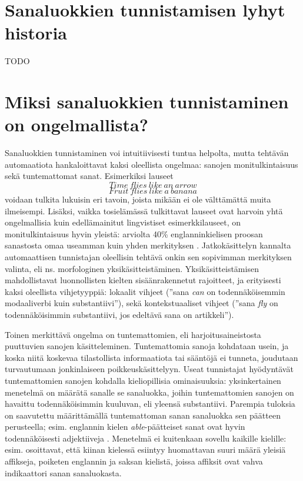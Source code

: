 \documentclass[utf8,bachelor,manualbib]{gradu3}
\begin{document}
\section{Sanaluokkien tunnistamisen lyhyt historia}

TODO


\section{Miksi sanaluokkien tunnistaminen on ongelmallista?}

Sanaluokkien tunnistaminen voi intuitiivisesti tuntua helpolta, mutta tehtävän automaatiota hankaloittavat kaksi oleellista ongelmaa: sanojen monitulkintaisuus sekä tuntemattomat sanat. Esimerkiksi lauseet
\[Time\: flies\: like\: an\: arrow\]
\[Fruit\: flies\: like\: a\: banana\]
voidaan tulkita lukuisin eri tavoin, joista mikään ei ole välttämättä muita ilmeisempi. Lisäksi, vaikka tosielämässä tulkittavat lauseet ovat harvoin yhtä ongelmallisia kuin edellämainitut lingvistiset esimerkkilauseet, on monitulkintaisuus hyvin yleistä: arviolta 40\% englanninkielisen proosan sanastosta omaa useamman kuin yhden merkityksen \citep{derose1988}. Jatkokäsittelyn kannalta automaattisen tunnistajan oleellisin tehtävä onkin sen sopivimman merkityksen valinta, eli ns. morfologinen yksikäsitteistäminen. Yksikäsitteistämisen mahdollistavat luonnollisten kielten sisäänrakennetut rajoitteet, ja erityisesti kaksi oleellista vihjetyyppiä: lokaalit vihjeet (''sana \textit{can} on todennäköisemmin modaaliverbi kuin substantiivi''), sekä kontekstuaaliset vihjeet (''sana \textit{fly} on todennäköisimmin substantiivi, jos edeltävä sana on artikkeli'').

Toinen merkittävä ongelma on tuntemattomien, eli harjoitusaineistosta puuttuvien sanojen käsitteleminen. Tuntemattomia sanoja kohdataan usein, ja koska niitä koskevaa tilastollista informaatiota tai sääntöjä ei tunneta, joudutaan turvautumaan jonkinlaiseen poikkeuskäsittelyyn. Useat tunnistajat hyödyntävät tuntemattomien sanojen kohdalla kieliopillisia ominaisuuksia: yksinkertainen menetelmä on määrätä sanalle se sanaluokka, joihin tuntemattomien sanojen on havaittu todennäköisimmin kuuluvan, eli yleensä substantiivi. Parempia tuloksia on saavutettu määrittämällä tuntemattoman sanan sanaluokka sen päätteen perusteella; esim. englannin kielen \emph{able}-päätteiset sanat ovat hyvin todennäköisesti adjektiiveja \citep{samuelsson1993}. Menetelmä ei kuitenkaan sovellu kaikille kielille: esim. \citet{tseng2005} osoittavat, että kiinan kielessä esiintyy huomattavan suuri määrä yleisiä affikseja, poiketen englannin ja saksan kielistä, joissa affiksit ovat vahva indikaattori sanan sanaluokasta.
\end{document}
